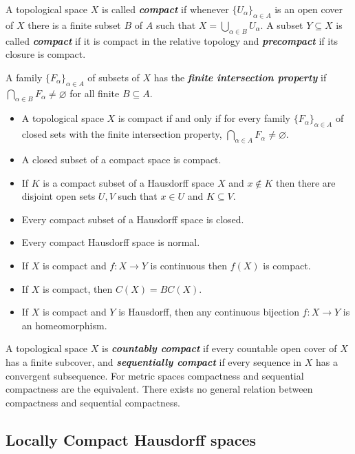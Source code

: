 \documentclass{article}
\theoremstyle{definition}
\begin{document}
		A topological space $X$ is called \textbf{\textit{compact}} if whenever $\{U_\alpha\}_{\alpha\in A}$ is an open cover of $X$ there is a finite subset $B$ of $A$ such that $X=\bigcup_{\alpha\in B}U_\alpha$. A subset $Y\subseteq X$ is called \textbf{\textit{compact}} if it is compact in the relative topology and \textbf{\textit{precompact}} if its closure is compact.
		
		A family $\{F_\alpha\}_{\alpha\in A}$ of subsets of $X$ has the \textbf{\textit{finite intersection property}} if $\bigcap_{\alpha\in B}F_\alpha\neq\varnothing$ for all finite $B\subseteq A$.
		
		\begin{prop}\leavevmode
			\begin{itemize}
				\item A topological space $X$ is compact if and only if for every family $\{F_\alpha\}_{\alpha\in A}$ of closed sets with the finite intersection property, $\bigcap_{\alpha\in A}F_\alpha\neq\varnothing$.
				\item A closed subset of a compact space is compact.
				\item If $K$ is a compact subset of a Hausdorff space $X$ and $x\notin K$ then there are disjoint open sets $U,V$ such that $x\in U$ and $K\subseteq V$.
				\item Every compact subset of a Hausdorff space is closed.
				\item Every compact Hausdorff space is normal.
				\item If $X$ is compact and $f:X\to Y$ is continuous then $f(X)$ is compact.
				\item If $X$ is compact, then $C(X)=BC(X)$.
				\item If $X$ is compact and $Y$ is Hausdorff, then any continuous bijection $f:X\to Y$ is an homeomorphism.
			\end{itemize}
		\end{prop}
		A topological space $X$ is \textbf{\textit{countably compact}} if every countable open cover of $X$ has a finite subcover, and \textbf{\textit{sequentially compact}} if every sequence in $X$ has a convergent subsequence. For metric spaces compactness and sequential compactness are the equivalent. There exists no general relation between compactness and sequential compactness.
		
		\subsection{Locally Compact Hausdorff spaces}
		
\end{document}
